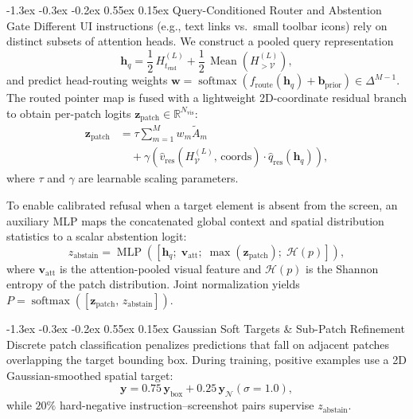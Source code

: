\documentclass[10pt,twocolumn,letterpaper]{article}
\makeatletter
\renewcommand\subsection{\@startsection{subsection}{2}{\z@}%
  {-1.3ex \@plus -0.3ex \@minus -0.2ex}%
  {0.55ex \@plus 0.15ex}%
  {\normalfont\normalsize\bfseries\color{navy!85!black}}}
\DeclareMathOperator{\softmax}{softmax}
\DeclareMathOperator{\Mean}{Mean}
\DeclareMathOperator{\MLP}{MLP}
\makeatother
\begin{document}
\subsection{Query-Conditioned Router and Abstention Gate}
Different UI instructions (e.g., text links vs.\ small toolbar icons) rely on distinct subsets of attention heads. We construct a pooled query representation
\begin{equation}
  \bm{h}_q = \frac{1}{2}\,H^{(L)}_{t_{\mathrm{end}}} + \frac{1}{2}\,\Mean\!\left(H^{(L)}_{>\mathcal{V}}\right),
  \label{eq:hq}
\end{equation}
and predict head-routing weights $\bm{w} = \softmax(f_{\mathrm{route}}(\bm{h}_q) + \bm{b}_{\mathrm{prior}}) \in \Delta^{M-1}$. The routed pointer map is fused with a lightweight 2D-coordinate residual branch to obtain per-patch logits $\bm{z}_{\mathrm{patch}} \in \mathbb{R}^{N_{\mathrm{vis}}}$:
\begin{align}
  \bm{z}_{\mathrm{patch}} &= \tau \sum_{m=1}^{M} w_m \tilde{A}_m \nonumber \\
  &\quad + \gamma \left(\hat{v}_{\mathrm{res}}\!\left(H^{(L)}_{\mathcal{V}},\, \mathrm{coords}\right) \cdot \hat{q}_{\mathrm{res}}(\bm{h}_q)\right),
  \label{eq:zpatch}
\end{align}
where $\tau$ and $\gamma$ are learnable scaling parameters.

To enable calibrated refusal when a target element is absent from the screen, an auxiliary MLP maps the concatenated global context and spatial distribution statistics to a scalar abstention logit:
\begin{equation}
  z_{\mathrm{abstain}} = \MLP\!\left(\left[\bm{h}_q;\; \bm{v}_{\mathrm{att}};\; \max(\bm{z}_{\mathrm{patch}});\; \mathcal{H}(p)\right]\right),
  \label{eq:abstain}
\end{equation}
where $\bm{v}_{\mathrm{att}}$ is the attention-pooled visual feature and $\mathcal{H}(p)$ is the Shannon entropy of the patch distribution. Joint normalization yields $P = \softmax([\bm{z}_{\mathrm{patch}},\, z_{\mathrm{abstain}}])$.

\subsection{Gaussian Soft Targets \& Sub-Patch Refinement}
Discrete patch classification penalizes predictions that fall on adjacent patches overlapping the target bounding box. During training, positive examples use a 2D Gaussian-smoothed spatial target:
\begin{equation}
  \bm{y} = 0.75\,\bm{y}_{\mathrm{box}} + 0.25\,\bm{y}_{\mathcal{N}}(\sigma{=}1.0),
  \label{eq:softtarget}
\end{equation}
while $20\%$ hard-negative instruction--screenshot pairs supervise $z_{\mathrm{abstain}}$.
\end{document}
